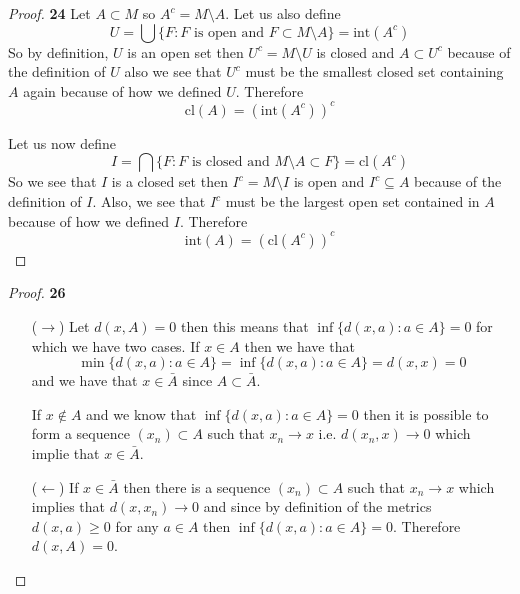 \documentclass[11pt]{article}
\theoremstyle{definition}
\begin{document}
	\begin{proof}{\textbf{24}}
        Let $A \subset M$ so $A^c = M \setminus A$. Let us also define
        $$U = \bigcup\{F: F \text{ is open and } F\subset M\setminus A\} = \text{int}(A^c)$$
        So by definition, $U$ is an open set then $U^c = M \setminus U$ is
        closed and $A \subset U^c$ because of the definition of $U$
        also we see that $U^c$ must be the smallest closed set containing $A$
        again because of how we defined $U$. Therefore
        $$\text{cl}(A) = (\text{int}(A^c))^c$$

        Let us now define
        $$I = \bigcap\{F: F \text{ is closed and } M\setminus A \subset F\} = \text{cl}(A^c)$$
        So we see that $I$ is a closed set then $I^c = M \setminus I$ is
        open and $I^c \subseteq A$ because of the definition of $I$.
        Also, we see that $I^c$ must be the largest open set contained in $A$
        because of how we defined $I$. Therefore
        $$\text{int}(A) = (\text{cl}(A^c))^c$$
    \end{proof}
\cleardoublepage
    \begin{proof}{\textbf{26}}
        \begin{itemize}
            \item [($\rightarrow$)] Let $d(x, A) = 0$ then this means that
            $\inf\{d(x,a): a \in A\} = 0$ for which we have two cases. If $x \in A$
            then we have that 
            $$\min\{d(x,a): a \in A\} = \inf\{d(x,a): a \in A\} = d(x,x) = 0$$
            and we have that $x \in \bar{A}$ since $A \subset \bar{A}$.
            
            If $x \not\in A$ and we know that $\inf\{d(x,a): a \in A\} = 0$
            then it is possible to form a sequence $(x_n) \subset A$ such that
            $x_n \to x$ i.e. $d(x_n, x) \to 0$ which implie that
            $x \in \bar{A}$.
            
            \item [($\leftarrow$)] If $x \in \bar{A}$ then there is a sequence
            $(x_n) \subset A$ such that $x_n \to x$ which implies that
            $d(x, x_n) \to 0$ and since by definition of the metrics
            $d(x,a) \geq 0$ for any
            $a \in A$ then $\inf\{d(x,a): a \in A\} = 0$. Therefore
            $d(x, A) = 0$.
        \end{itemize}
    \end{proof}
\end{document}
